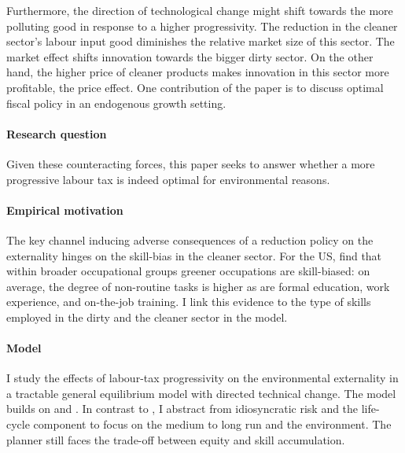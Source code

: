 Furthermore, the direction of technological change might shift towards the more polluting good in response to a higher progressivity. The reduction in the cleaner sector's labour input good diminishes the relative market size of this sector. The market effect shifts innovation towards the bigger dirty sector. On the other hand, the higher price of cleaner products makes innovation in this sector more profitable, the price effect. 
One contribution of the paper is to discuss optimal fiscal policy in an endogenous growth setting. 


\paragraph{Research question}
Given these counteracting forces, this paper seeks to answer whether a more progressive labour tax is indeed optimal for environmental reasons. 

\paragraph{Empirical motivation}
The key channel inducing adverse consequences of a reduction policy on the externality hinges on the skill-bias in the cleaner sector. %
For the US, \cite{Consoli2016DoCapital} find that within broader occupational groups greener occupations are skill-biased: on average, the degree of non-routine tasks is higher as are formal education, work experience, and on-the-job training. I link this evidence to the type of skills employed in the dirty and the cleaner sector in the model. %


\paragraph{Model}
I study the effects of labour-tax progressivity  on the environmental externality in a tractable general equilibrium model with directed technical change. The model builds on \cite{Heathcote2017OptimalFramework} and \cite{Acemoglu2012TheChange}.
In contrast to \cite{Heathcote2017OptimalFramework}, I abstract from idiosyncratic risk and the life-cycle component to focus on the medium to long run and the environment. 
The planner still faces the trade-off between equity and skill accumulation. 

